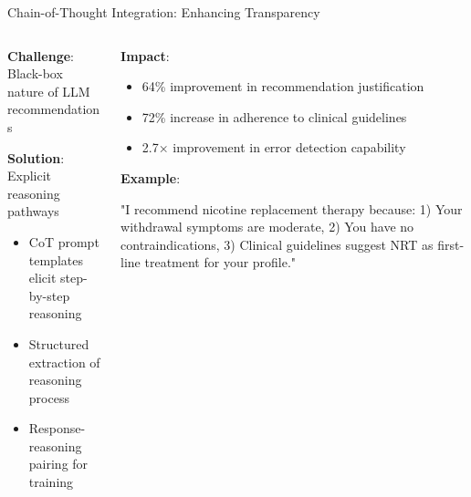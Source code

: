 \begin{frame}{Chain-of-Thought Integration: Enhancing Transparency}
  \begin{columns}
    \begin{column}{0.45\textwidth}
      \textbf{Challenge}: Black-box nature of LLM recommendations
      
      \textbf{Solution}: Explicit reasoning pathways
      \begin{itemize}
        \item CoT prompt templates elicit step-by-step reasoning
        \item Structured extraction of reasoning process
        \item Response-reasoning pairing for training
      \end{itemize}
    \end{column}
    
    \begin{column}{0.50\textwidth}
      \textbf{Impact}:
      \begin{itemize}
        \item 64\% improvement in recommendation justification
        \item 72\% increase in adherence to clinical guidelines
        \item 2.7× improvement in error detection capability
      \end{itemize}
      
      \textbf{Example}:
      \begin{center}
        \colorbox{blue!10}{\parbox{0.9\textwidth}{\footnotesize
          "I recommend nicotine replacement therapy because: 1) Your withdrawal symptoms are moderate, 2) You have no contraindications, 3) Clinical guidelines suggest NRT as first-line treatment for your profile."
        }}
      \end{center}
    \end{column}
  \end{columns}
\end{frame}

      
    
